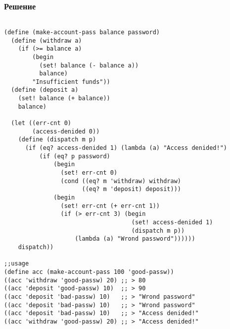 \documentclass[10pt,a4paper]{article}
\begin{document}
\subsubsection*{Решение}
\begin{lstlisting}

(define (make-account-pass balance password)
  (define (withdraw a)
    (if (>= balance a)
        (begin
          (set! balance (- balance a))
          balance)
        "Insufficient funds"))
  (define (deposit a)
    (set! balance (+ balance))
    balance)
  
  (let ((err-cnt 0)
        (access-denided 0))
    (define (dispatch m p)
      (if (eq? access-denided 1) (lambda (a) "Access denided!")
          (if (eq? p password)
              (begin
                (set! err-cnt 0)
                (cond ((eq? m 'withdraw) withdraw)
                      ((eq? m 'deposit) deposit)))
              (begin
                (set! err-cnt (+ err-cnt 1))
                (if (> err-cnt 3) (begin
                                    (set! access-denided 1)
                                    (dispatch m p))
                    (lambda (a) "Wrond password"))))))
    dispatch))

;;usage
(define acc (make-account-pass 100 'good-passw))
((acc 'withdraw 'good-passw) 20) ;; > 80
((acc 'deposit 'good-passw) 10)  ;; > 90
((acc 'deposit 'bad-passw) 10)   ;; > "Wrond password"
((acc 'deposit 'bad-passw) 10)   ;; > "Wrond password"
((acc 'deposit 'bad-passw) 10)   ;; > "Access denided!"
((acc 'withdraw 'good-passw) 20) ;; > "Access denided!"

\end{lstlisting}
\end{document}
